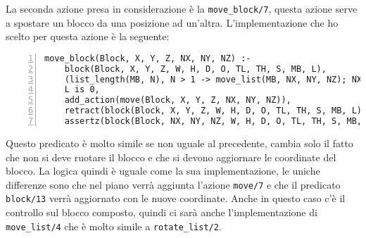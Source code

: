La seconda azione presa in considerazione è la \verb+move_block/7+, questa azione serve a spostare un blocco da una posizione ad un'altra. L'implementazione che ho scelto per questa azione è la seguente:
\begin{lstlisting}[numbers=left]
move_block(Block, X, Y, Z, NX, NY, NZ) :-
    block(Block, X, Y, Z, W, H, D, O, TL, TH, S, MB, L),
    (list_length(MB, N), N > 1 -> move_list(MB, NX, NY, NZ); NX = NX, NY = NY, NZ = NZ),
    L is 0,
    add_action(move(Block, X, Y, Z, NX, NY, NZ)),
    retract(block(Block, X, Y, Z, W, H, D, O, TL, TH, S, MB, L)),
    assertz(block(Block, NX, NY, NZ, W, H, D, O, TL, TH, S, MB, L)).
\end{lstlisting}
Questo predicato è molto simile se non uguale al precedente, cambia solo il fatto che non si deve ruotare il blocco e che si devono aggiornare le coordinate del blocco. La logica quindi è uguale come la sua implementazione, le uniche differenze sono che nel piano verrà aggiunta l'azione \verb+move/7+ e che il predicato \verb+block/13+ verrà aggiornato con le nuove coordinate. Anche in questo caso c'è il controllo sul blocco composto, quindi ci sarà anche l'implementazione di \verb+move_list/4+ che è molto simile a \verb+rotate_list/2+.

